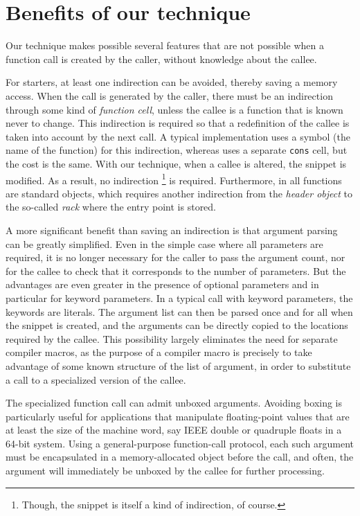 \section{Benefits of our technique}
\label{sec-benefits}

Our technique makes possible several features that are not possible
when a function call is created by the caller, without knowledge
about the callee.

For starters, at least one indirection can be avoided, thereby saving
a memory access.  When the call is generated by the caller, there must
be an indirection through some kind of \emph{function cell}, unless the
callee is a function that is known never to change.  This indirection
is required so that a redefinition of the callee is taken into account
by the next call.  A typical \commonlisp{} implementation uses a
symbol (the name of the function) for this indirection, whereas
\sicl{} uses a separate \texttt{cons} cell, but the cost is the same.
With our technique, when a callee is altered, the snippet is
modified.  As a result, no indirection%
\footnote{Though, the snippet is itself a kind of indirection, of course.}
is required.  Furthermore, in
\sicl{} all functions are standard objects, which requires another
indirection from the \emph{header object} to the so-called \emph{rack}
where the entry point is stored.

A more significant benefit than saving an indirection is that argument
parsing can be greatly simplified.  Even in the simple case where all
parameters are required, it is no longer necessary for the caller to
pass the argument count, nor for the callee to check that it
corresponds to the number of parameters.  But the advantages are even
greater in the presence of optional parameters and in particular for
keyword parameters.  In a typical call with keyword parameters, the
keywords are literals.  The argument list can then be parsed once and
for all when the snippet is created, and the arguments can be directly
copied to the locations required by the callee.  This possibility
largely eliminates the need for separate compiler macros, as the
purpose of a compiler macro is precisely to take advantage of some
known structure of the list of argument, in order to substitute a call
to a specialized version of the callee.

The specialized function call can admit unboxed arguments.  Avoiding
boxing is particularly useful for applications that manipulate
floating-point values that are at least the size of the machine word,
say IEEE double or quadruple floats in a 64-bit system.  Using a
general-purpose function-call protocol, each such argument must be
encapsulated in a memory-allocated object before the call, and often,
the argument will immediately be unboxed by the callee for further
processing.


